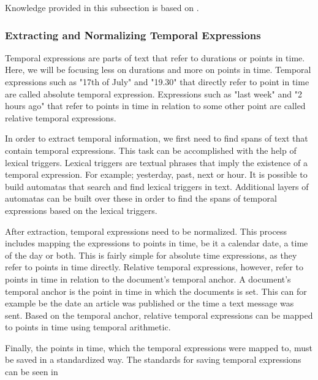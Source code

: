 Knowledge provided in this subsection is based on \parencite{nlp_ie}.

\subsubsection{Extracting and Normalizing Temporal Expressions}
Temporal expressions are parts of text that refer to durations or points in time.  
Here, we will be focusing less on durations and more on points in time.
Temporal expressions such as "17th of July" and "19.30" that directly refer to point in time are called absolute temporal expression. 
Expressions such as "last week" and "2 hours ago" that refer to points in time in relation to some other point are called relative temporal expressions.


In order to extract temporal information, we first need to find spans of text that contain temporal expressions.
This task can be accomplished with the help of lexical triggers.
Lexical triggers are textual phrases that imply the existence of a temporal expression.
For example; yesterday, past, next or hour.
It is possible to build automatas that search and find lexical triggers in text.
Additional layers of automatas can be built over these in order to find the spans of temporal expressions based on the lexical triggers.

After extraction, temporal expressions need to be normalized.
This process includes mapping the expressions to points in time, be it a calendar date, a time of the day or both.
This is fairly simple for absolute time expressions, as they refer to points in time directly.
Relative temporal expressions, however, refer to points in time in relation to the document's temporal anchor.
A document's temporal anchor is the point in time in which the documents is set. 
This can for example be the date an article was published or the time a text message was sent.
Based on the temporal anchor, relative temporal expressions can be mapped to points in time using temporal arithmetic.

Finally, the points in time, which the temporal expressions were mapped to, must be saved in a standardized way.
The standards for saving temporal expressions can be seen in \parencite{ISO8601}

